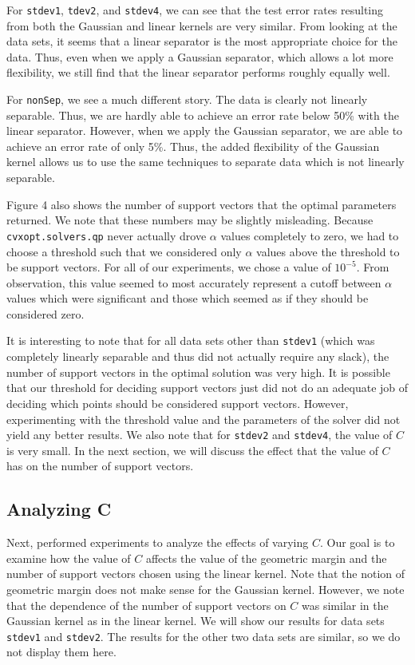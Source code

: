 \documentclass{sigchi}
\begin{document}
For \texttt{stdev1}, \texttt{tdev2}, and \texttt{stdev4}, we can see that the test error rates resulting from both the Gaussian and linear kernels are very similar. From looking at the data sets, it seems that a linear separator is the most appropriate choice for the data. Thus, even when we apply a Gaussian separator, which allows a lot more flexibility, we still find that the linear separator performs roughly equally well.

For \texttt{nonSep}, we see a much different story. The data is clearly not linearly separable. Thus, we are hardly able to achieve an error rate below 50\% with the linear separator. However, when we apply the Gaussian separator, we are able to achieve an error rate of only 5\%. Thus, the added flexibility of the Gaussian kernel allows us to use the same techniques to separate data which is not linearly separable.

Figure 4 also shows the number of support vectors that the optimal parameters returned. We note that these numbers may be slightly misleading. Because \texttt{cvxopt.solvers.qp} never actually drove $\alpha$ values completely to zero, we had to choose a threshold such that we considered only $\alpha$ values above the threshold to be support vectors. For all of our experiments, we chose a value of $10^{-5}$. From observation, this value seemed to most accurately represent a cutoff between $\alpha$ values which were significant and those which seemed as if they should be considered zero.

It is interesting to note that for all data sets other than \texttt{stdev1} (which was completely linearly separable and thus did not actually require any slack), the number of support vectors in the optimal solution was very high. It is possible that our threshold for deciding support vectors just did not do an adequate job of deciding which points should be considered support vectors. However, experimenting with the threshold value and the parameters of the solver did not yield any better results. We also note that for \texttt{stdev2} and \texttt{stdev4}, the value of $C$ is very small. In the next section, we will discuss the effect that the value of $C$ has on the number of support vectors.

\subsection{Analyzing C}

Next, performed experiments to analyze the effects of varying $C$. Our goal is to examine how the value of $C$ affects the value of the geometric margin and the number of support vectors chosen using the linear kernel. Note that the notion of geometric margin does not make sense for the Gaussian kernel. However, we note that the dependence of the number of support vectors on $C$ was similar in the Gaussian kernel as in the linear kernel. We will show our results for data sets \texttt{stdev1} and \texttt{stdev2}. The results for the other two data sets are similar, so we do not display them here.
\end{document}
